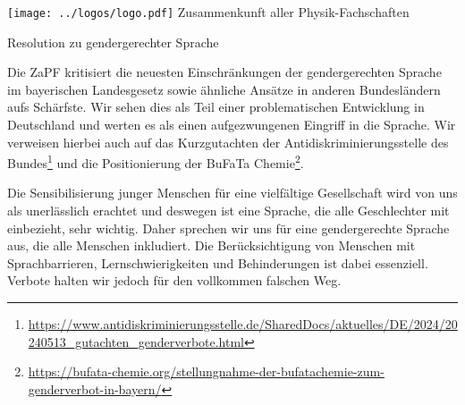 \documentclass[DIV=calc]{scrartcl}
\begin{document}
\hspace{0.87\textwidth}
\begin{minipage}{120pt}
	\vspace{-1.8cm}
	\texttt{[image: ../logos/logo.pdf]}
	\centering
	\small Zusammenkunft aller Physik-Fachschaften
\end{minipage}

\begin{center}
  \huge{Resolution zu gendergerechter Sprache}\vspace{.25\baselineskip}\\
  \normalsize
\end{center}
\vspace{1cm}








Die ZaPF kritisiert die neuesten Einschränkungen der gendergerechten Sprache im
bayerischen Landesgesetz sowie ähnliche Ansätze in anderen Bundesländern aufs
Schärfste. Wir sehen dies als Teil einer problematischen Entwicklung in Deutschland
und werten es als einen aufgezwungenen Eingriff in die Sprache. Wir
verweisen hierbei auch auf das
Kurzgutachten der Antidiskriminierungsstelle des Bundes\footnote{\url{https://www.antidiskriminierungsstelle.de/SharedDocs/aktuelles/DE/2024/20240513_gutachten_genderverbote.html}} und die Positionierung
der BuFaTa Chemie\footnote{\url{https://bufata-chemie.org/stellungnahme-der-bufatachemie-zum-genderverbot-in-bayern/}}.

Die Sensibilisierung junger Menschen für eine vielfältige Gesellschaft wird von uns
als unerlässlich erachtet und deswegen ist eine Sprache, die alle Geschlechter mit
einbezieht, sehr wichtig. Daher sprechen wir uns für eine gendergerechte Sprache aus,
die alle Menschen inkludiert. Die Berücksichtigung von Menschen mit Sprachbarrieren,
Lernschwierigkeiten und Behinderungen ist dabei essenziell. Verbote halten wir jedoch
für den vollkommen falschen Weg.
\end{document}
